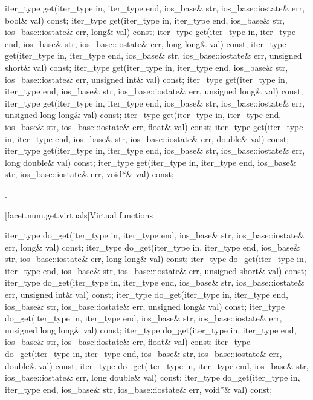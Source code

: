%
\begin{itemdecl}
iter_type get(iter_type in, iter_type end, ios_base& str,
              ios_base::iostate& err, bool& val) const;
iter_type get(iter_type in, iter_type end, ios_base& str,
              ios_base::iostate& err, long& val) const;
iter_type get(iter_type in, iter_type end, ios_base& str,
              ios_base::iostate& err, long long& val) const;
iter_type get(iter_type in, iter_type end, ios_base& str,
              ios_base::iostate& err, unsigned short& val) const;
iter_type get(iter_type in, iter_type end, ios_base& str,
              ios_base::iostate& err, unsigned int& val) const;
iter_type get(iter_type in, iter_type end, ios_base& str,
              ios_base::iostate& err, unsigned long& val) const;
iter_type get(iter_type in, iter_type end, ios_base& str,
              ios_base::iostate& err, unsigned long long& val) const;
iter_type get(iter_type in, iter_type end, ios_base& str,
              ios_base::iostate& err, float& val) const;
iter_type get(iter_type in, iter_type end, ios_base& str,
              ios_base::iostate& err, double& val) const;
iter_type get(iter_type in, iter_type end, ios_base& str,
              ios_base::iostate& err, long double& val) const;
iter_type get(iter_type in, iter_type end, ios_base& str,
              ios_base::iostate& err, void*& val) const;
\end{itemdecl}

\begin{itemdescr}
\pnum
\returns
{}.
\end{itemdescr}

[facet.num.get.virtuals]{Virtual functions}

%
\begin{itemdecl}
iter_type do_get(iter_type in, iter_type end, ios_base& str,
                ios_base::iostate& err, long& val) const;
iter_type do_get(iter_type in, iter_type end, ios_base& str,
                ios_base::iostate& err, long long& val) const;
iter_type do_get(iter_type in, iter_type end, ios_base& str,
                ios_base::iostate& err, unsigned short& val) const;
iter_type do_get(iter_type in, iter_type end, ios_base& str,
                ios_base::iostate& err, unsigned int& val) const;
iter_type do_get(iter_type in, iter_type end, ios_base& str,
                ios_base::iostate& err, unsigned long& val) const;
iter_type do_get(iter_type in, iter_type end, ios_base& str,
                ios_base::iostate& err, unsigned long long& val) const;
iter_type do_get(iter_type in, iter_type end, ios_base& str,
                ios_base::iostate& err, float& val) const;
iter_type do_get(iter_type in, iter_type end, ios_base& str,
                ios_base::iostate& err, double& val) const;
iter_type do_get(iter_type in, iter_type end, ios_base& str,
                ios_base::iostate& err, long double& val) const;
iter_type do_get(iter_type in, iter_type end, ios_base& str,
                ios_base::iostate& err, void*& val) const;
\end{itemdecl}

